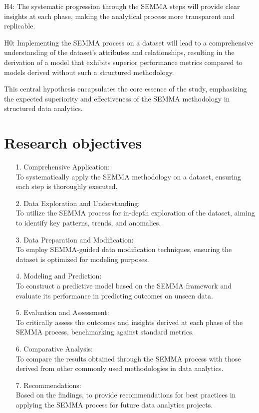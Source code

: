 \documentclass{article}
\begin{document}
H4: The systematic progression through the SEMMA steps will provide clear insights at each phase, making the analytical process more transparent and replicable.

H0: Implementing the SEMMA process on a dataset will lead to a comprehensive understanding of the dataset's attributes and relationships, resulting in the derivation of a model that exhibits superior performance metrics compared to models derived without such a structured methodology.

This central hypothesis encapsulates the core essence of the study, emphasizing the expected superiority and effectiveness of the SEMMA methodology in structured data analytics.

\section{Research objectives}
\begin{itemize}
    \item[1.] Comprehensive Application:\\ To systematically apply the SEMMA methodology on a dataset, ensuring each step is thoroughly executed.
    \item[2.] Data Exploration and Understanding:\\ To utilize the SEMMA process for in-depth exploration of the dataset, aiming to identify key patterns, trends, and anomalies.
    \item[3.] Data Preparation and Modification: \\To employ SEMMA-guided data modification techniques, ensuring the dataset is optimized for modeling purposes.
    \item[4.]Modeling and Prediction: \\To construct a predictive model based on the SEMMA framework and evaluate its performance in predicting outcomes on unseen data.
    \item[5.]Evaluation and Assessment: \\To critically assess the outcomes and insights derived at each phase of the SEMMA process, benchmarking against standard metrics.
    \item[6.]Comparative Analysis:\\ To compare the results obtained through the SEMMA process with those derived from other commonly used methodologies in data analytics.
    \item[7.]Recommendations:\\ Based on the findings, to provide recommendations for best practices in applying the SEMMA process for future data analytics projects.
\end{itemize}
\end{document}
